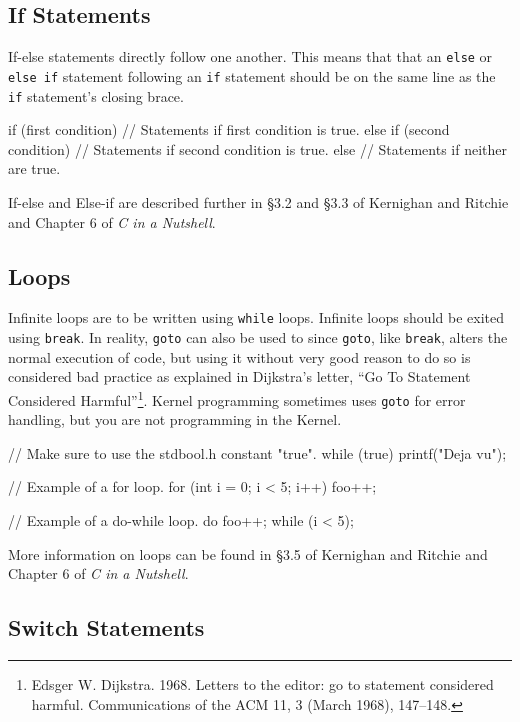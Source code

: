 \documentclass[11pt]{article}
\begin{document}
\subsection{If Statements}

If-else statements directly follow one another. This means that that an
\texttt{else} or \texttt{else if} statement following an \texttt{if} statement
should be on the same line as the \texttt{if} statement's closing brace.

\begin{codelisting}{}
if (first condition) {
    // Statements if first condition is true.
} else if (second condition) {
    // Statements if second condition is true.
} else {
    // Statements if neither are true.
}
\end{codelisting}

If-else and Else-if are described further in \S 3.2 and \S 3.3 of Kernighan and
Ritchie and Chapter 6 of \emph{C in a Nutshell}.


\subsection{Loops}

Infinite loops are to be written using \texttt{while} loops. Infinite loops
should be exited using \texttt{break}. In reality, \texttt{goto} can also be
used to since \texttt{goto}, like \texttt{break}, alters the normal execution of
code, but using it without very good reason to do so is considered bad practice
as explained in Dijkstra's letter, ``Go To Statement Considered
Harmful''\footnote{Edsger W. Dijkstra. 1968. Letters to the editor: go to
  statement considered harmful. Communications of the ACM 11, 3 (March 1968),
147--148.}. Kernel programming sometimes uses \texttt{goto} for error handling,
but you are not programming in the Kernel.

\begin{codelisting}{}
// Make sure to use the stdbool.h constant "true".
while (true) {
    printf("Deja vu");
}

// Example of a for loop.
for (int i = 0; i < 5; i++) {
    foo++;
}

// Example of a do-while loop.
do {
    foo++;
} while (i < 5);
\end{codelisting}

 More information on loops can be found in \S 3.5 of Kernighan and Ritchie and
Chapter 6 of \emph{C in a Nutshell}.


\subsection{Switch Statements}
\end{document}
